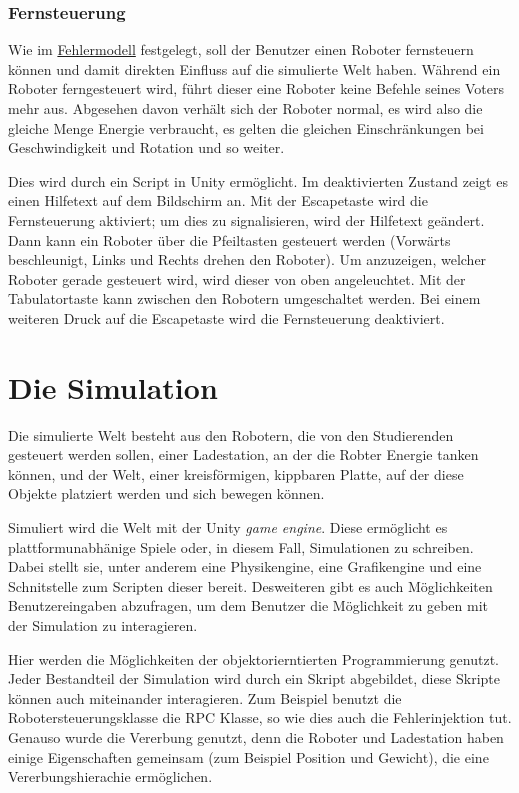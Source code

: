 \subsubsection{Fernsteuerung}
Wie im \hyperref[fm]{Fehlermodell} festgelegt, soll der Benutzer einen Roboter fernsteuern k{\"{o}}nnen
und damit direkten Einfluss auf die simulierte Welt haben. W{\"{a}}hrend ein Roboter ferngesteuert wird, 
f{\"{u}}hrt dieser eine Roboter keine Befehle seines Voters mehr aus. Abgesehen davon verh{\"{a}}lt sich der
Roboter normal, es wird also die gleiche Menge Energie verbraucht, es gelten die gleichen
Einschr{\"{a}}nkungen bei Geschwindigkeit und Rotation und so weiter.

Dies wird durch ein Script in Unity erm{\"{o}}glicht. Im deaktivierten Zustand zeigt es einen Hilfetext
auf dem Bildschirm an. Mit der Escapetaste wird die Fernsteuerung aktiviert; um dies zu signalisieren, wird
der Hilfetext ge{\"{a}}ndert. Dann kann ein Roboter {\"{u}}ber die Pfeiltasten gesteuert werden
(Vorw{\"{a}}rts beschleunigt, Links und Rechts drehen den Roboter). Um anzuzeigen, welcher Roboter
gerade gesteuert wird, wird dieser von oben angeleuchtet. Mit der Tabulatortaste kann zwischen den
Robotern umgeschaltet werden. Bei einem weiteren Druck auf die Escapetaste wird die Fernsteuerung deaktiviert.


\clearpage
\section{Die Simulation}
Die simulierte Welt besteht aus den Robotern, die von den Studierenden gesteuert werden sollen, einer Ladestation, an der die Robter Energie tanken k{\"{o}}nnen, und
der Welt, einer kreisf{\"{o}}rmigen, kippbaren Platte, auf der diese Objekte platziert werden und sich bewegen k{\"{o}}nnen.

Simuliert wird die Welt mit der Unity \textit{game engine}. Diese erm{\"{o}}glicht es plattformunabh{\"{a}}nige 
Spiele oder, in diesem Fall, Simulationen zu schreiben. Dabei stellt sie, unter anderem eine Physikengine,
eine Grafikengine und eine Schnitstelle zum Scripten dieser bereit. Desweiteren gibt es auch M{\"{o}}glichkeiten Benutzereingaben
abzufragen, um dem Benutzer die M{\"{o}}glichkeit zu geben mit der Simulation zu interagieren.

Hier werden die M{\"{o}}glichkeiten der objektorierntierten Programmierung genutzt. Jeder Bestandteil der Simulation wird durch
ein Skript abgebildet, diese Skripte k{\"{o}}nnen auch miteinander interagieren. Zum Beispiel benutzt die Robotersteuerungsklasse
die RPC Klasse, so wie dies auch die Fehlerinjektion tut. Genauso wurde die Vererbung genutzt, denn die Roboter und Ladestation haben
einige Eigenschaften gemeinsam (zum Beispiel Position und Gewicht), die eine Vererbungshierachie erm{\"{o}}glichen.


